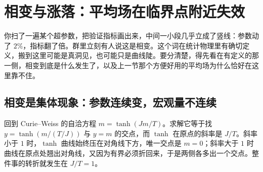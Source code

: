 \section{相变与涨落：平均场在临界点附近失效}
\label{sec:13-Machine-Learning/13-Statistical-Physics-and-Free-Energy/03}

你扫了一遍某个超参数，把验证指标画出来，中间一小段几乎立成了竖线：参数动了 \(2\%\)，指标翻了倍。群里立刻有人说这是相变。这个词在统计物理里有确切定义，搬到这里可能是真洞见，也可能只是曲线陡。要分清楚，得先看在有定义的那一侧，相变到底是什么发生了，以及上一节那个方便好用的平均场为什么恰好在这里靠不住。

\subsection{相变是集体现象：参数连续变，宏观量不连续}

回到 Curie--Weiss 的自洽方程 \(m=\tanh(Jm/T)\)。求解它等于找 \(y=\tanh(m/(T/J))\) 与 \(y=m\) 的交点，而 \(\tanh\) 在原点的斜率是 \(J/T\)。斜率小于 \(1\) 时，\(\tanh\) 曲线始终压在对角线下方，唯一交点是 \(m=0\)；斜率大于 \(1\) 时曲线在原点处翘出对角线，又因为有界必须折回来，于是两侧各多出一个交点。整件事的转折就发生在 \(J/T=1\)。

